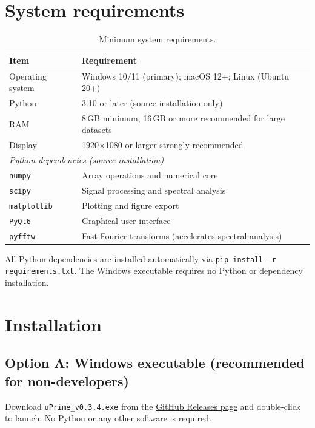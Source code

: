 \documentclass[11pt, a4paper]{report}
\begin{document}
\section{System requirements}

\begin{table}[htbp]
\centering
\caption{Minimum system requirements.}
\begin{tabular}{ll}
\toprule
\textbf{Item} & \textbf{Requirement} \\
\midrule
Operating system  & Windows 10/11 (primary); macOS 12+; Linux (Ubuntu 20+) \\
Python            & 3.10 or later (source installation only) \\
RAM               & 8\,GB minimum; 16\,GB or more recommended for large datasets \\
Display           & 1920$\times$1080 or larger strongly recommended \\
\midrule
\multicolumn{2}{l}{\textit{Python dependencies (source installation)}} \\
\midrule
\texttt{numpy}      & Array operations and numerical core \\
\texttt{scipy}      & Signal processing and spectral analysis \\
\texttt{matplotlib} & Plotting and figure export \\
\texttt{PyQt6}      & Graphical user interface \\
\texttt{pyfftw}     & Fast Fourier transforms (accelerates spectral analysis) \\
\bottomrule
\end{tabular}
\end{table}

\begin{notebox}
All Python dependencies are installed automatically via \texttt{pip install -r requirements.txt}. The Windows executable requires no Python or dependency installation.
\end{notebox}

\section{Installation}

\subsection{Option A: Windows executable (recommended for non-developers)}

Download \texttt{uPrime\_v0.3.4.exe} from the
\href{https://github.com/CmdrRyder/uPrime/releases}{GitHub Releases page}
and double-click to launch. No Python or any other software is required.
\end{document}

